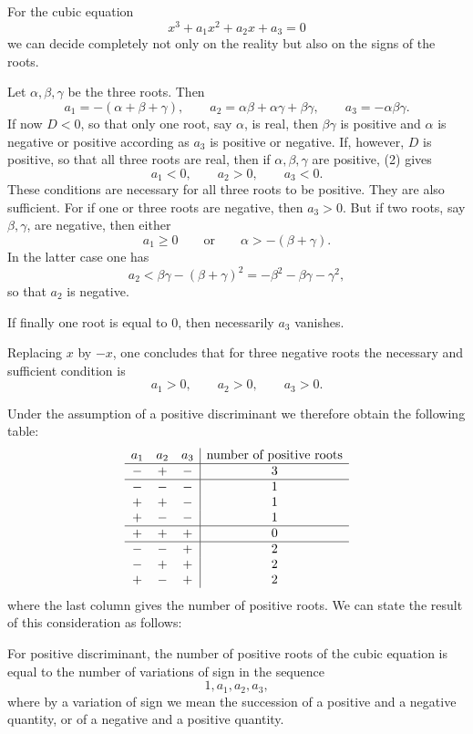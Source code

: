 \documentclass[11pt]{article}
\begin{document}
For the cubic equation
\[
        x^3+a_1x^2+a_2x+a_3=0
\]
we can decide completely not only on the reality but also on the signs of the roots.

Let $\alpha,\beta,\gamma$ be the three roots. Then
\begin{equation}
        a_1=-(\alpha+\beta+\gamma),\qquad
        a_2=\alpha\beta+\alpha\gamma+\beta\gamma,
        \qquad a_3=-\alpha\beta\gamma.
\tag{2}
\end{equation}
If now $D<0$, so that only one root, say $\alpha$, is real, then $\beta\gamma$ is positive and $\alpha$ is negative or positive according as $a_3$ is positive or negative. If, however, $D$ is positive, so that all three roots are real, then if $\alpha,\beta,\gamma$ are positive, (2) gives
\begin{equation}
        a_1<0,
        \qquad a_2>0,
        \qquad a_3<0.
\tag{3}
\end{equation}
These conditions are necessary for all three roots to be positive. They are also sufficient. For if one or three roots are negative, then $a_3>0$. But if two roots, say $\beta,\gamma$, are negative, then either
\[
        a_1\geq 0 \qquad\text{or}\qquad \alpha>-(\beta+\gamma).
\]
In the latter case one has
\[
        a_2<\beta\gamma-(\beta+\gamma)^2=-\beta^2-\beta\gamma-\gamma^2,
\]
so that $a_2$ is negative.

If finally one root is equal to $0$, then necessarily $a_3$ vanishes.

Replacing $x$ by $-x$, one concludes that for three negative roots the necessary and sufficient condition is
\begin{equation}
        a_1>0,
        \qquad a_2>0,
        \qquad a_3>0.
\tag{4}
\end{equation}

Under the assumption of a positive discriminant we therefore obtain the following table:
\[
\begin{array}{ccc|c}
 a_1 & a_2 & a_3 & \text{number of positive roots}\cr\hline
 - & + & - & 3\cr\hline
 - & - & - & 1\cr
 + & + & - & 1\cr
 + & - & - & 1\cr\hline
 + & + & + & 0\cr\hline
 - & - & + & 2\cr
 - & + & + & 2\cr
 + & - & + & 2
\end{array}
\]
where the last column gives the number of positive roots. We can state the result of this consideration as follows:

For positive discriminant, the number of positive roots of the cubic equation is equal to the number of variations of sign in the sequence
\[
        1,a_1,a_2,a_3,
\]
where by a variation of sign we mean the succession of a positive and a negative quantity, or of a negative and a positive quantity.
\end{document}
